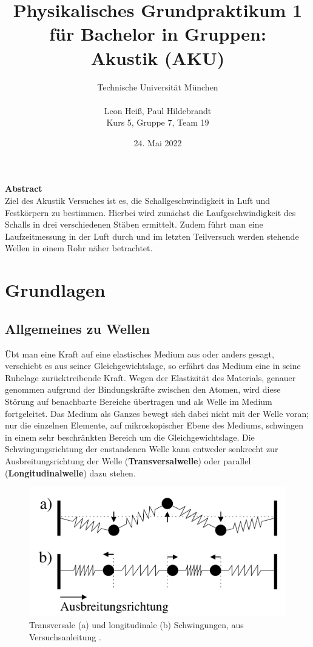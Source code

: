\documentclass{article}
\title{Physikalisches Grundpraktikum 1 für Bachelor in Gruppen:\\Akustik (AKU)}
\author{Technische Universität München\\\\Leon Heiß, Paul Hildebrandt \\
Kurs 5, Gruppe 7, Team 19}
\date{24. Mai 2022}
\begin{document}
\maketitle

\large
\begin{center}
\textbf{Abstract}\\
\normalsize
\medskip
Ziel des Akustik Versuches ist es, die Schallgeschwindigkeit in Luft und Festkörpern zu bestimmen.
Hierbei wird zunächst die Laufgeschwindigkeit des Schalls in drei verschiedenen Stäben ermittelt.
Zudem führt man eine Laufzeitmessung in der Luft durch und im letzten Teilversuch werden stehende
Wellen in einem Rohr näher betrachtet.

\end{center}
\normalsize

\tableofcontents

\section{Grundlagen}
\subsection{Allgemeines zu Wellen}
Übt man eine Kraft auf eine elastisches Medium aus oder anders gesagt, verschiebt es aus seiner Gleichgewichtslage, so erfährt das Medium eine in seine Ruhelage zurücktreibende Kraft.
Wegen der  Elastizität des Materials, genauer genommen aufgrund der Bindungskräfte zwischen den Atomen, wird diese  Störung auf benachbarte Bereiche übertragen und als Welle im Medium fortgeleitet. Das Medium als Ganzes bewegt sich dabei nicht mit der Welle voran; nur die einzelnen Elemente, auf mikroskopischer Ebene des Mediums, schwingen in einem sehr  beschränkten  Bereich  um  die  Gleichgewichtslage. 
Die Schwingungsrichtung der enstandenen Welle kann entweder senkrecht zur Ausbreitungsrichtung der Welle (\textbf{Transversalwelle}) oder parallel (\textbf{Longitudinalwelle}) dazu stehen.
\begin{figure}[hbt!]
\centering
\includegraphics[scale=0.18]{ausbreitungsrichtung.png}
\caption{Transversale (a) und longitudinale (b) Schwingungen, aus Versuchsanleitung \cite{1} .}
\end{figure}
\end{document}
